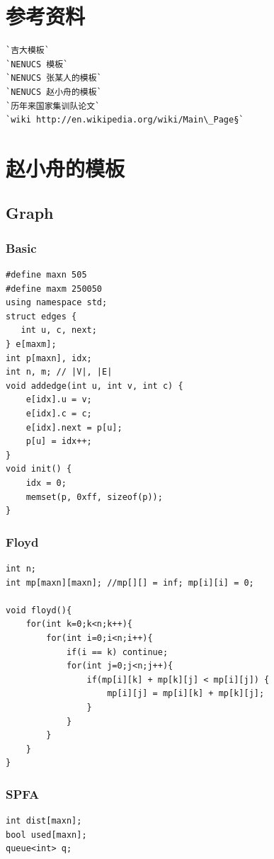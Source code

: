 \documentclass[a4paper]{article}
\begin{document}
\begin{CJK*}{UTF8}{gbsn}
\begin{multicols}{3}
\begin{flushleft}
\section{参考资料}
\begin{lstlisting}
`吉大模板`
`NENUCS 模板`
`NENUCS 张某人的模板`
`NENUCS 赵小舟的模板`
`历年来国家集训队论文`
`wiki http://en.wikipedia.org/wiki/Main\_Page§`
\end{lstlisting}




\section{赵小舟的模板}

\subsection{Graph}

\subsubsection{Basic}

\begin{lstlisting}
#define maxn 505
#define maxm 250050
using namespace std;
struct edges {
   int u, c, next;
} e[maxm];
int p[maxn], idx;
int n, m; // |V|, |E|
void addedge(int u, int v, int c) {
    e[idx].u = v;
    e[idx].c = c;
    e[idx].next = p[u];
    p[u] = idx++;
}
void init() {
    idx = 0;
    memset(p, 0xff, sizeof(p));
}
\end{lstlisting}

\subsubsection{Floyd}
\begin{lstlisting}
int n;
int mp[maxn][maxn]; //mp[][] = inf; mp[i][i] = 0;

void floyd(){
    for(int k=0;k<n;k++){
        for(int i=0;i<n;i++){
            if(i == k) continue;
            for(int j=0;j<n;j++){
                if(mp[i][k] + mp[k][j] < mp[i][j]) {
                    mp[i][j] = mp[i][k] + mp[k][j];
                }
            }
        }
    }
}
\end{lstlisting}
\subsubsection{SPFA}
\begin{lstlisting}
int dist[maxn];
bool used[maxn];
queue<int> q;


\end{lstlisting}
\end{flushleft}
\end{multicols}
\end{CJK*}
\end{document}
